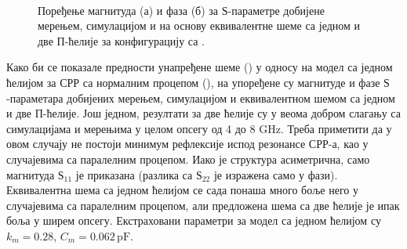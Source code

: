 \begin{figure}[!t]
\centering
{}\\
\caption{Поређење магнитуда (а) и фаза (б) за $Ѕ$-параметре добијене мерењем, симулацијом и на основу еквивалентне шеме са једном и две П-ћелије за конфигурацију са .}
\label{f14}
\end{figure}
Како би се показале предности унапређене шеме () у односу на модел са једном ћелијом за СРР са нормалним процепом (), на  упоређене су магнитуде и фазе $Ѕ$-параметара добијених мерењем, симулацијом и еквивалентном шемом са једном и две П-ћелије. Још једном, резултати за две ћелије су у веома добром слагању са симулацијама и мерењима у целом опсегу од 4 до 8 GHz. Треба приметити да у овом случају не постоји минимум рефлексије испод резонансе СРР-а, као у случајевима са паралелним процепом. Иако је структура асиметрична, само магнитуда $Ѕ_{11}$ је приказана (разлика са $Ѕ_{22}$ је изражена само у фази). Еквивалентна шема са једном ћелијом се сада понаша много боље него у случајевима са паралелним процепом, али предложена шема са две ћелије је ипак боља у ширем опсегу. Екстраховани параметри за модел са једном ћелијом су $k_m=\num{0.28}$, $C_m=\num{0.062}\,\mathrm{pF}$.

